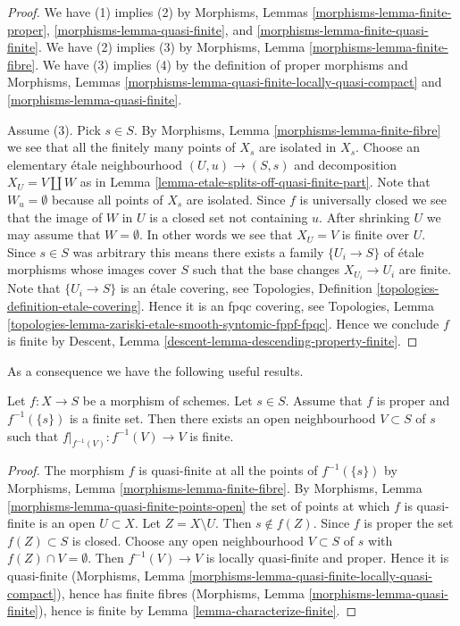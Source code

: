 \begin{proof}
We have (1) implies (2) by
Morphisms, Lemmas \ref{morphisms-lemma-finite-proper},
\ref{morphisms-lemma-quasi-finite},
and \ref{morphisms-lemma-finite-quasi-finite}.
We have (2) implies (3) by Morphisms, Lemma \ref{morphisms-lemma-finite-fibre}.
We have (3) implies (4) by the definition of proper morphisms and
Morphisms, Lemmas \ref{morphisms-lemma-quasi-finite-locally-quasi-compact} and
\ref{morphisms-lemma-quasi-finite}.

\medskip\noindent
Assume (3). Pick $s \in S$. By
Morphisms, Lemma \ref{morphisms-lemma-finite-fibre} we
see that all the finitely many points of $X_s$ are isolated in $X_s$.
Choose an elementary \'etale neighbourhood $(U, u) \to (S, s)$
and decomposition $X_U = V \amalg W$ as in
Lemma \ref{lemma-etale-splits-off-quasi-finite-part}.
Note that $W_u = \emptyset$ because all points of $X_s$ are isolated.
Since $f$ is universally closed we see that
the image of $W$ in $U$ is a closed set not containing $u$.
After shrinking $U$ we may assume that $W = \emptyset$.
In other words we see that $X_U = V$ is finite over $U$.
Since $s \in S$ was arbitrary
this means there exists a family $\{U_i \to S\}$
of \'etale morphisms whose images cover $S$ such that
the base changes $X_{U_i} \to U_i$ are finite.
Note that $\{U_i \to S\}$ is an \'etale covering,
see Topologies, Definition \ref{topologies-definition-etale-covering}.
Hence it is an fpqc covering, see
Topologies,
Lemma \ref{topologies-lemma-zariski-etale-smooth-syntomic-fppf-fpqc}.
Hence we conclude $f$ is finite by
Descent, Lemma \ref{descent-lemma-descending-property-finite}.
\end{proof}

\noindent
As a consequence we have the following useful results.

\begin{lemma}
\label{lemma-proper-finite-fibre-finite-in-neighbourhood}
Let $f : X \to S$ be a morphism of schemes.
Let $s \in S$.
Assume that $f$ is proper and $f^{-1}(\{s\})$ is a finite set.
Then there exists an open neighbourhood $V \subset S$ of $s$
such that $f|_{f^{-1}(V)} : f^{-1}(V) \to V$ is finite.
\end{lemma}

\begin{proof}
The morphism $f$ is quasi-finite at all the points of $f^{-1}(\{s\})$
by Morphisms, Lemma \ref{morphisms-lemma-finite-fibre}.
By Morphisms, Lemma \ref{morphisms-lemma-quasi-finite-points-open} the
set of points at which $f$ is quasi-finite is an open $U \subset X$.
Let $Z = X \setminus U$. Then $s \not \in f(Z)$. Since $f$ is proper
the set $f(Z) \subset S$ is closed. Choose any open neighbourhood
$V \subset S$ of $s$ with $f(Z) \cap V = \emptyset$. Then
$f^{-1}(V) \to V$ is locally quasi-finite and proper.
Hence it is quasi-finite
(Morphisms, Lemma \ref{morphisms-lemma-quasi-finite-locally-quasi-compact}),
hence has finite fibres
(Morphisms, Lemma \ref{morphisms-lemma-quasi-finite}), hence
is finite by Lemma \ref{lemma-characterize-finite}.
\end{proof}

